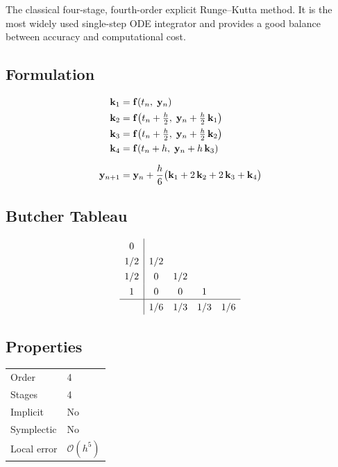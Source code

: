 \documentclass[11pt,a4paper]{article}
\newcommand{\bk}{\mathbf{k}}
\newcommand{\by}{\mathbf{y}}
\newcommand{\bff}{\mathbf{f}}
\newcommand{\bigO}{\mathcal{O}}
\begin{document}
The classical four-stage, fourth-order explicit Runge--Kutta method. It is the
most widely used single-step ODE integrator and provides a good balance between
accuracy and computational cost.

\subsection{Formulation}
\begin{align}
  \bk_1 &= \bff(t_n,\;\by_n) \notag\\
  \bk_2 &= \bff\!\left(t_n + \tfrac{h}{2},\;\by_n + \tfrac{h}{2}\,\bk_1\right) \notag\\
  \bk_3 &= \bff\!\left(t_n + \tfrac{h}{2},\;\by_n + \tfrac{h}{2}\,\bk_2\right) \notag\\
  \bk_4 &= \bff\!\left(t_n + h,\;\by_n + h\,\bk_3\right) \notag\\[6pt]
  \by_{n+1} &= \by_n + \frac{h}{6}\bigl(\bk_1 + 2\,\bk_2 + 2\,\bk_3 + \bk_4\bigr)
  \label{eq:rk4}
\end{align}

\subsection{Butcher Tableau}
\[
\renewcommand{\arraystretch}{1.3}
\begin{array}{c|cccc}
  0   &      &      &      &     \\
  1/2 & 1/2  &      &      &     \\
  1/2 & 0    & 1/2  &      &     \\
  1   & 0    & 0    & 1    &     \\
  \hline
      & 1/6  & 1/3  & 1/3  & 1/6 \\
\end{array}
\]

\subsection{Properties}
\begin{center}
\begin{tabular}{ll}
  \hline
  Order          & 4 \\
  Stages         & 4 \\
  Implicit       & No \\
  Symplectic     & No \\
  Local error    & $\bigO(h^5)$ \\
  \hline
\end{tabular}
\end{center}
\end{document}
